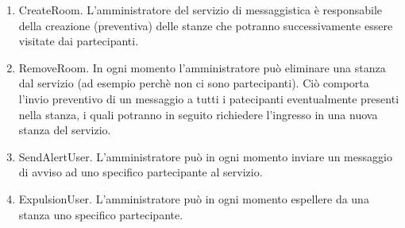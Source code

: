 \documentclass[t]{beamer} %
\let\olditem=\item%
\renewcommand{\item}{\olditem \justifying}%
\begin{document}
\begin{frame} [allowframebreaks]
\begin{enumerate}
          stanza del servizio cui era precedentemente associato l’utente.
    \item CreateRoom. L’amministratore del servizio di messaggistica è responsabile della creazione (preventiva) delle stanze che potranno successivamente essere 
          visitate dai partecipanti.
    \item RemoveRoom. In ogni momento l’amministratore può eliminare una stanza dal servizio (ad esempio perchè non ci sono partecipanti). Ciò comporta l’invio 
          preventivo di un messaggio a tutti i patecipanti eventualmente presenti nella stanza, i quali potranno in seguito richiedere l’ingresso in una   
          nuova stanza del servizio.
    \item SendAlertUser. L’amministratore può in ogni momento inviare un messaggio di avviso ad uno specifico partecipante al servizio.
    \item ExpulsionUser. L’amministratore può in ogni momento espellere da una stanza uno specifico partecipante.  
   \end{enumerate}
\end{frame}
\end{document}
